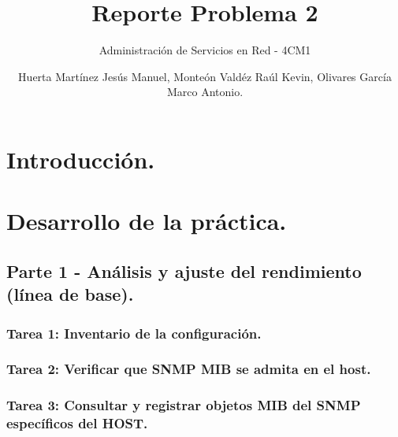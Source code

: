 \documentclass[oneside,10pt]{book}
\title{Reporte Problema 2}
\subtitle{Administración de Servicios en Red - 4CM1}
\author{Huerta Martínez Jesús Manuel, Monteón Valdéz Raúl Kevin, Olivares García Marco Antonio.}
\begin{document}
\maketitle
\thispagestyle{empty}

\frontmatter
\tableofcontents

\mainmatter


\chapter{Introducción.}



\chapter{Desarrollo de la práctica.}



\section{Parte 1 - Análisis y ajuste del rendimiento (línea de base).}

\subsection{Tarea 1: Inventario de la configuración.}

\subsection{Tarea 2: Verificar que SNMP MIB se admita en el host.}

\subsection{Tarea 3: Consultar y registrar objetos MIB del SNMP específicos del HOST.}
\end{document}
